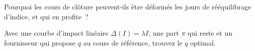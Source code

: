 \begin{interviewq}\label{iq:hf:auctions-and-the-close:5}
Pourquoi les cours de clôture peuvent-ils être déformés les jours de rééquilibrage d'indice, et qui en profite~?
\end{interviewq}

\begin{interviewq}\label{iq:hf:auctions-and-the-close:6}
Avec une courbe d'impact linéaire $\Delta(I)=\lambda I$, une part $\pi$ qui reste et un fournisseur qui propose $q$ au cours de référence, trouvez le $q$ optimal.
\end{interviewq}
